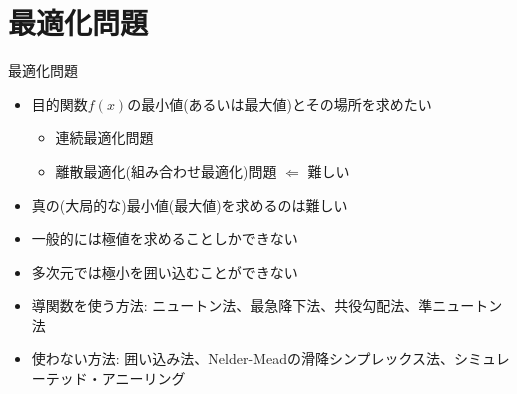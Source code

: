 \section{最適化問題}

\begin{frame}[t,fragile]{最適化問題}
  \begin{itemize}
  \item 目的関数$f(x)$の最小値(あるいは最大値)とその場所を求めたい
    \begin{itemize}
    \item 連続最適化問題
    \item 離散最適化(組み合わせ最適化)問題 $\Leftarrow$ 難しい
    \end{itemize}
  \item 真の(大局的な)最小値(最大値)を求めるのは難しい
  \item 一般的には極値を求めることしかできない
  \item 多次元では極小を囲い込むことができない
  \item 導関数を使う方法: ニュートン法、最急降下法、共役勾配法、準ニュートン法
  \item 使わない方法: 囲い込み法、Nelder-Meadの滑降シンプレックス法、シミュレーテッド・アニーリング
  \end{itemize}
\end{frame}

